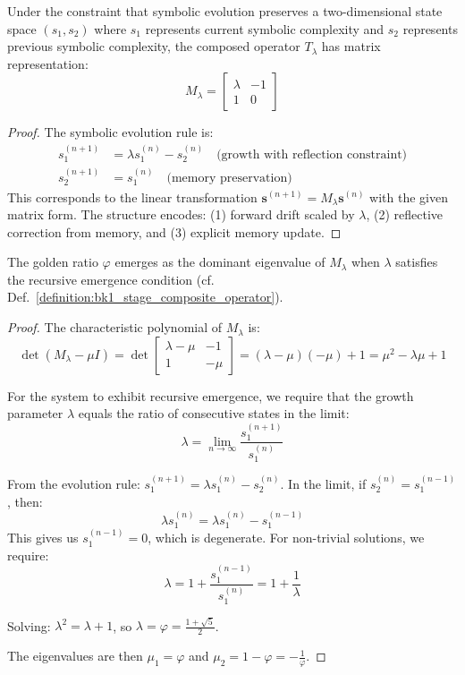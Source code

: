 \begin{lemma}
\label{lem:appC_matrix_representation_symbolic_operators}
Under the constraint that symbolic evolution preserves a two-dimensional state space $(s_1, s_2)$ where $s_1$ represents current symbolic complexity and $s_2$ represents previous symbolic complexity, the composed operator $T_\lambda$ has matrix representation:
\[
M_\lambda = \begin{bmatrix} \lambda & -1 \\ 1 & 0 \end{bmatrix}
\]
\end{lemma}

\begin{proof}
The symbolic evolution rule is:
\begin{align}
s_1^{(n+1)} &= \lambda s_1^{(n)} - s_2^{(n)} \quad \text{(growth with reflection constraint)} \\
s_2^{(n+1)} &= s_1^{(n)} \quad \text{(memory preservation)}
\end{align}
This corresponds to the linear transformation $\mathbf{s}^{(n+1)} = M_\lambda \mathbf{s}^{(n)}$ with the given matrix form. The structure encodes: (1) forward drift scaled by $\lambda$, (2) reflective correction from memory, and (3) explicit memory update.
\end{proof}

\begin{theorem}
\label{theorem:appC_phi_eigenvalue_recursive_emergence}
The golden ratio $\varphi$ emerges as the dominant eigenvalue of $M_\lambda$ when $\lambda$ satisfies the recursive emergence condition (cf. Def.~\ref{definition:bk1_stage_composite_operator}).
\end{theorem}

\begin{proof}
The characteristic polynomial of $M_\lambda$ is:
\[
\det(M_\lambda - \mu I) = \det\begin{bmatrix} \lambda-\mu & -1 \\ 1 & -\mu \end{bmatrix} = (\lambda-\mu)(-\mu) + 1 = \mu^2 - \lambda\mu + 1
\]

For the system to exhibit recursive emergence, we require that the growth parameter $\lambda$ equals the ratio of consecutive states in the limit:
\[
\lambda = \lim_{n \to \infty} \frac{s_1^{(n+1)}}{s_1^{(n)}}
\]

From the evolution rule: $s_1^{(n+1)} = \lambda s_1^{(n)} - s_2^{(n)}$. In the limit, if $s_2^{(n)} = s_1^{(n-1)}$, then:
\[
\lambda s_1^{(n)} = \lambda s_1^{(n)} - s_1^{(n-1)}
\]
This gives us $s_1^{(n-1)} = 0$, which is degenerate. For non-trivial solutions, we require:
\[
\lambda = 1 + \frac{s_1^{(n-1)}}{s_1^{(n)}} = 1 + \frac{1}{\lambda}
\]

Solving: $\lambda^2 = \lambda + 1$, so $\lambda = \varphi = \frac{1 + \sqrt{5}}{2}$.

The eigenvalues are then $\mu_1 = \varphi$ and $\mu_2 = 1 - \varphi = -\frac{1}{\varphi}$.
\end{proof}

